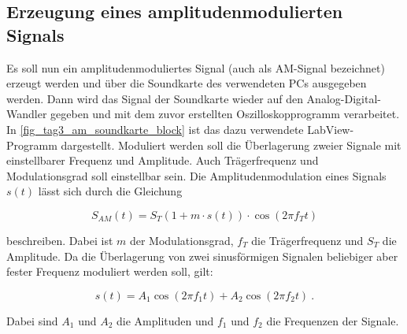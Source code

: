 \documentclass[
a4paper,
12pt,
pagesize,
ngerman
]{scrartcl}
\begin{document}
	\subsection{Erzeugung eines amplitudenmodulierten Signals} \label{AMSignalErzeugung}
	
	Es soll nun ein amplitudenmoduliertes Signal (auch als AM-Signal bezeichnet) erzeugt werden und über die Soundkarte des verwendeten PCs ausgegeben werden.
	Dann wird das Signal der Soundkarte wieder auf den Analog-Digital-Wandler gegeben und mit dem zuvor erstellten Oszilloskopprogramm verarbeitet.
	In \cref{fig_tag3_am_soundkarte_block} ist das dazu verwendete LabView-Programm dargestellt.
	Moduliert werden soll die Überlagerung zweier Signale mit einstellbarer Frequenz und Amplitude.
	Auch Trägerfrequenz und Modulationsgrad soll einstellbar sein.
	Die Amplitudenmodulation eines Signals $s(t)$ lässt sich durch die Gleichung
	
	\begin{equation} \label{AMFormel}
		S_{AM}(t)=S_T (1+m \cdot s(t)) \cdot \cos(2\pi f_T t)
	\end{equation}
	
	\noindent beschreiben.
	Dabei ist $m$ der Modulationsgrad, $f_T$ die Trägerfrequenz und $S_T$ die Amplitude.
	Da die Überlagerung von zwei sinusförmigen Signalen beliebiger aber fester Frequenz moduliert werden soll, gilt:
	
	\begin{equation} \label{Ursprungssignal}
		s(t) = A_1 \cos (2\pi f_1 t) + A_2 \cos (2\pi f_2 t) \ . 
	\end{equation}
	
	\noindent Dabei sind $A_1$ und $A_2$ die Amplituden und $f_1$ und $f_2$ die Frequenzen der Signale.
	
\end{document}

